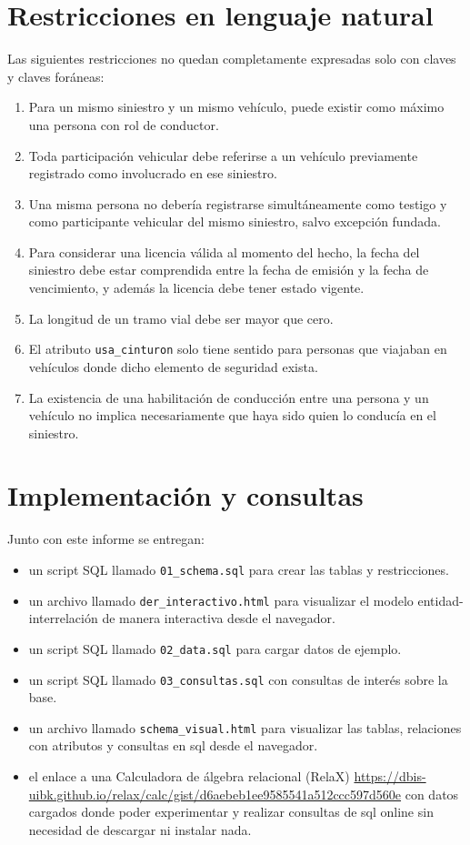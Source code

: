 \documentclass[12pt,a4paper]{article}
\begin{document}
\section{Restricciones en lenguaje natural}

Las siguientes restricciones no quedan completamente expresadas solo con claves y claves foráneas:

\begin{enumerate}[leftmargin=*]
    \item Para un mismo siniestro y un mismo vehículo, puede existir como máximo una persona con rol de conductor.
    \item Toda participación vehicular debe referirse a un vehículo previamente registrado como involucrado en ese siniestro.
    \item Una misma persona no debería registrarse simultáneamente como testigo y como participante vehicular del mismo siniestro, salvo excepción fundada.
    \item Para considerar una licencia válida al momento del hecho, la fecha del siniestro debe estar comprendida entre la fecha de emisión y la fecha de vencimiento, y además la licencia debe tener estado vigente.
    \item La longitud de un tramo vial debe ser mayor que cero.
    \item El atributo \texttt{usa\_cinturon} solo tiene sentido para personas que viajaban en vehículos donde dicho elemento de seguridad exista.
    \item La existencia de una habilitación de conducción entre una persona y un vehículo no implica necesariamente que haya sido quien lo conducía en el siniestro.
\end{enumerate}

\section{Implementación y consultas}

Junto con este informe se entregan:

\begin{itemize}[leftmargin=*]
    \item un script SQL llamado \texttt{01\_schema.sql} para crear las tablas y restricciones.
    \item un archivo llamado \texttt{der\_interactivo.html} para visualizar el modelo entidad-interrelación de manera interactiva desde el navegador.
    \item un script SQL llamado \texttt{02\_data.sql} para cargar datos de ejemplo.
    \item un script SQL llamado \texttt{03\_consultas.sql} con consultas de interés sobre la base.
    \item un archivo llamado \texttt{schema\_visual.html} para visualizar las tablas, relaciones con atributos y consultas en sql desde el navegador.
    \item el enlace a una Calculadora de álgebra relacional (RelaX) \url{https://dbis-uibk.github.io/relax/calc/gist/d6aebeb1ee9585541a512ccc597d560e} con datos cargados donde poder experimentar y realizar consultas de sql online sin necesidad de descargar ni instalar nada.
\end{itemize}
\end{document}
